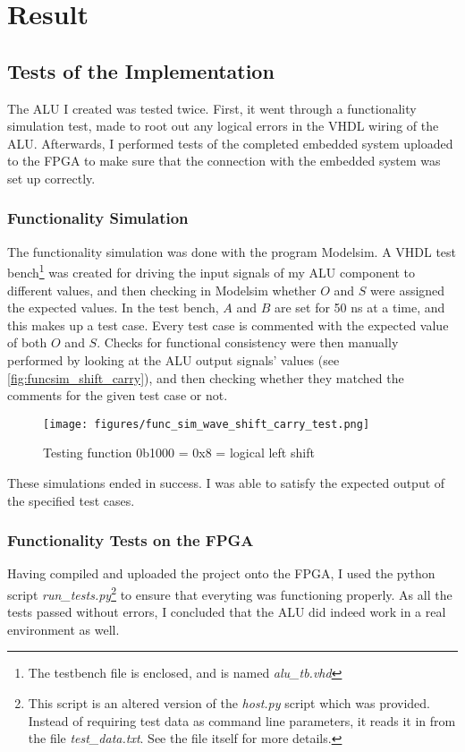 \documentclass{article}
\begin{document}
\section{Result}
\label{sec:result}

\subsection{Tests of the Implementation}
\label{subsec:tests}
The ALU I created was tested twice. First, it went through a functionality simulation test, made to root out any logical errors in the VHDL wiring of the ALU. Afterwards, I performed tests of the completed embedded system uploaded to the FPGA to make sure that the connection with the embedded system was set up correctly. 
\subsubsection{Functionality Simulation}
\label{subsubsec:funcsim}
The functionality simulation was done with the program Modelsim. A VHDL test bench\footnote{The testbench file is enclosed, and is named \emph{alu\_tb.vhd}} was created for driving the input signals of my ALU component to different values, and then checking in Modelsim whether $O$ and $S$ were assigned the expected values. In the test bench, $A$ and $B$ are set for 50 ns at a time, and this makes up a test case. Every test case is commented with the expected value of both $O$ and $S$. Checks for functional consistency were then manually performed by looking at the ALU output signals' values (see \autoref{fig:funcsim_shift_carry}), and then checking whether they matched the comments for the given test case or not. 
\begin{figure}[htbp]
  \centering
  \texttt{[image: figures/func\_sim\_wave\_shift\_carry\_test.png]}
  \caption{\label{fig:funcsim_shift_carry} Testing function 0b1000 = 0x8 = logical left shift}
\end{figure}

These simulations ended in success. I was able to satisfy the expected output of the specified test cases.

\subsubsection{Functionality Tests on the FPGA}
\label{subsubsec:funcfpga}
Having compiled and uploaded the project onto the FPGA, I used the python script \emph{run\_tests.py}\footnote{This script is an altered version of the \emph{host.py} script which was provided. Instead of requiring test data as command line parameters, it reads it in from the file \emph{test\_data.txt}. See the file itself for more details.} to ensure that everyting was functioning properly. As all the tests passed without errors, I concluded that the ALU did indeed work in a real environment as well.
\end{document}

